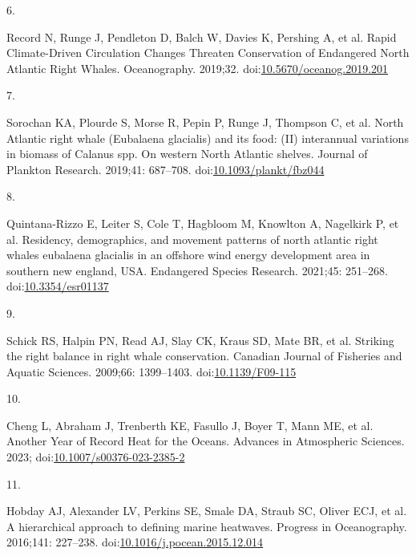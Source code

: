 \documentclass[
  10pt,
]{article}
\newlength{\cslhangindent}
\newlength{\csllabelwidth}
\newlength{\cslentryspacingunit} %
\newenvironment{CSLReferences}[2] %
 {%
  \setlength{\parindent}{0pt}
  \ifodd #1
  \let\oldpar\par
  \def\par{\hangindent=\cslhangindent\oldpar}
  \fi
  \setlength{\parskip}{#2\cslentryspacingunit}
 }%
 {}
\newcommand{\CSLLeftMargin}[1]{\parbox[t]{\csllabelwidth}{#1}}
\newcommand{\CSLRightInline}[1]{\parbox[t]{\linewidth - \csllabelwidth}{#1}\break}
\begin{document}
\begin{CSLReferences}{0}{0}
\leavevmode{}%
\CSLLeftMargin{6. }%
\CSLRightInline{Record N, Runge J, Pendleton D, Balch W, Davies K, Pershing A, et al. Rapid {Climate}-{Driven} {Circulation} {Changes} {Threaten} {Conservation} of {Endangered} {North} {Atlantic} {Right} {Whales}. Oceanography. 2019;32. doi:\href{https://doi.org/10.5670/oceanog.2019.201}{10.5670/oceanog.2019.201}}

\leavevmode{}%
\CSLLeftMargin{7. }%
\CSLRightInline{Sorochan KA, Plourde S, Morse R, Pepin P, Runge J, Thompson C, et al. North {Atlantic} right whale ({Eubalaena} glacialis) and its food: ({II}) interannual variations in biomass of {Calanus} spp. On western {North} {Atlantic} shelves. Journal of Plankton Research. 2019;41: 687--708. doi:\href{https://doi.org/10.1093/plankt/fbz044}{10.1093/plankt/fbz044}}

\leavevmode{}%
\CSLLeftMargin{8. }%
\CSLRightInline{Quintana-Rizzo E, Leiter S, Cole T, Hagbloom M, Knowlton A, Nagelkirk P, et al. Residency, demographics, and movement patterns of north atlantic right whales eubalaena glacialis in an offshore wind energy development area in southern new england, USA. Endangered Species Research. 2021;45: 251--268. doi:\href{https://doi.org/10.3354/esr01137}{10.3354/esr01137}}

\leavevmode{}%
\CSLLeftMargin{9. }%
\CSLRightInline{Schick RS, Halpin PN, Read AJ, Slay CK, Kraus SD, Mate BR, et al. Striking the right balance in right whale conservation. Canadian Journal of Fisheries and Aquatic Sciences. 2009;66: 1399--1403. doi:\href{https://doi.org/10.1139/F09-115}{10.1139/F09-115}}

\leavevmode{}%
\CSLLeftMargin{10. }%
\CSLRightInline{Cheng L, Abraham J, Trenberth KE, Fasullo J, Boyer T, Mann ME, et al. Another {Year} of {Record} {Heat} for the {Oceans}. Advances in Atmospheric Sciences. 2023; doi:\href{https://doi.org/10.1007/s00376-023-2385-2}{10.1007/s00376-023-2385-2}}

\leavevmode{}%
\CSLLeftMargin{11. }%
\CSLRightInline{Hobday AJ, Alexander LV, Perkins SE, Smale DA, Straub SC, Oliver ECJ, et al. A hierarchical approach to defining marine heatwaves. Progress in Oceanography. 2016;141: 227--238. doi:\href{https://doi.org/10.1016/j.pocean.2015.12.014}{10.1016/j.pocean.2015.12.014}}


\end{CSLReferences}
\end{document}
